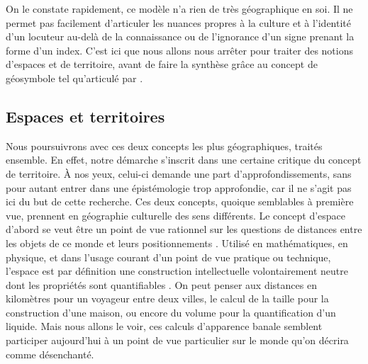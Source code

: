 On le constate rapidement, ce modèle n'a  rien de très géographique en soi. 
Il ne permet pas facilement d'articuler les nuances propres à la culture et à l'identité d'un locuteur au-delà de la connaissance ou de l'ignorance d'un signe prenant la forme d'un index. 
C'est ici que nous allons nous arrêter pour traiter des notions d'espaces et de territoire, avant de faire la synthèse grâce au concept de géosymbole tel qu'articulé par \citet{Bonnemaison1981}.


\subsection{Espaces et territoires}
\label{sec:espaces_et_territoires} Nous poursuivrons avec ces deux concepts les plus géographiques, traités ensemble. 
En effet, notre démarche s'inscrit dans une certaine critique du concept de territoire.
À nos yeux, celui-ci demande une part d'approfondissements,  sans pour autant entrer dans une épistémologie trop approfondie, car il ne s'agit pas ici du but de cette recherche. 
Ces deux concepts, quoique semblables à première vue, prennent en géographie culturelle des sens différents. 
Le concept d'espace d'abord se veut être un point de vue rationnel sur les questions de distances entre les objets de ce monde et leurs positionnements . 
Utilisé en mathématiques, en physique, et dans l'usage courant d'un point de vue pratique ou technique, l'espace est par définition une construction intellectuelle volontairement neutre dont les propriétés sont quantifiables .
On peut penser aux distances en kilomètres pour un voyageur entre deux villes, le calcul de la taille pour la construction d'une maison, ou encore du volume pour la quantification d'un liquide. 
Mais nous allons le voir, ces calculs d'apparence banale semblent participer aujourd'hui à un point de vue particulier sur le monde qu'on décrira comme désenchanté.

